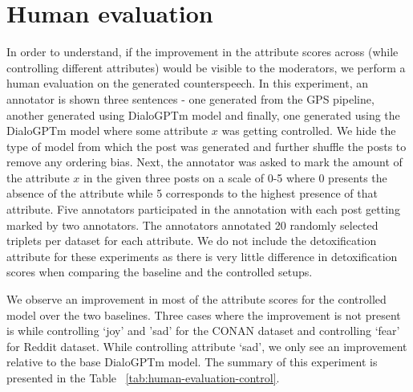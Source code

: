\section{Human evaluation}

In order to understand, if the improvement in the attribute scores across (while controlling different attributes) would be visible to the moderators, we perform a human evaluation on the generated counterspeech. In this experiment, an annotator is shown three sentences - one generated from the GPS pipeline, another generated using DialoGPTm model and finally, one generated using the DialoGPTm model where some attribute $x$ was getting controlled. We hide the type of model from which the post was generated and further shuffle the posts to remove any ordering bias. Next, the annotator was asked to mark the amount of the attribute $x$ in the given three posts on a scale of 0-5 where 0 presents the absence of the attribute while 5 corresponds to the highest presence of that attribute. Five annotators participated in the annotation with each post getting marked by two annotators. The annotators annotated 20 randomly selected triplets per dataset for each attribute. We do not include the detoxification attribute for these experiments as there is very little difference in detoxification scores when comparing the baseline and the controlled setups. 

We observe an improvement in most of the attribute scores for the controlled model over the two baselines. Three cases where the improvement is not present is while controlling `joy' and 'sad' for the CONAN dataset and controlling `fear' for Reddit dataset. While controlling attribute `sad', we only see an improvement relative to the base DialoGPTm model. The summary of this experiment is presented in the Table ~\ref{tab:human-evaluation-control}.


